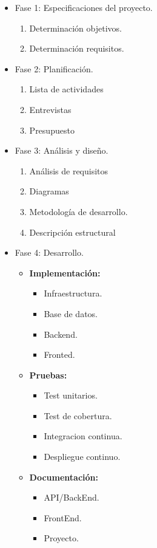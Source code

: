 \begin{itemize}
  \item Fase 1: Especificaciones del proyecto.
    \begin{enumerate}
      \item Determinación objetivos.
      \item Determinación requisitos.
    \end{enumerate}
  \item Fase 2: Planificación.
    \begin{enumerate}
      \item Lista de actividades
      \item Entrevistas
      \item Presupuesto
    \end{enumerate}
  \item Fase 3: Análisis y diseño.
    \begin{enumerate}
      \item Análisis de requisitos
      \item Diagramas
      \item Metodología de desarrollo.
      \item Descripción estructural
    \end{enumerate}
  \item Fase 4: Desarrollo.
    \begin{itemize}
       \item \textbf{Implementación:} 
       \begin{itemize}
         \item  Infraestructura.
         \item  Base de datos.
         \item  Backend.
         \item  Fronted.
       \end{itemize}
       \item \textbf{Pruebas:} 
       \begin{itemize}
        \item  \gls{Test unitarios}.
        \item  \gls{Test de cobertura}.
        \item  \gls{Integracion continua}.
        \item  \gls{Despliegue continuo}.
       \end{itemize}
       \item \textbf{Documentación:} 
       \begin{itemize}
        \item  API/BackEnd.
        \item  FrontEnd.
        \item  Proyecto.
       \end{itemize}
    \end{itemize}
\end{itemize}


